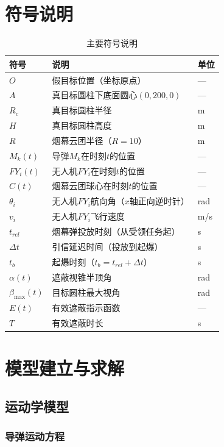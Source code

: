 \documentclass[12pt,a4paper]{article}
\begin{document}
\section{符号说明}

\begin{table}[H]
\centering
\caption{主要符号说明}
\begin{tabular}{lll}
\toprule
符号 & 说明 & 单位 \\
\midrule
$O$ & 假目标位置（坐标原点） & --- \\
$A$ & 真目标圆柱下底面圆心$(0,200,0)$ & --- \\
$R_c$ & 真目标圆柱半径 & m \\
$H$ & 真目标圆柱高度 & m \\
$R$ & 烟幕云团半径（$R=10$） & m \\
$M_k(t)$ & 导弹$M_k$在时刻$t$的位置 & --- \\
$FY_i(t)$ & 无人机$FY_i$在时刻$t$的位置 & --- \\
$C(t)$ & 烟幕云团球心在时刻$t$的位置 & --- \\
$\theta_i$ & 无人机$FY_i$航向角（$x$轴正向逆时针） & rad \\
$v_i$ & 无人机$FY_i$飞行速度 & m/s \\
$t_{rel}$ & 烟幕弹投放时刻（从受领任务起） & s \\
$\Delta t$ & 引信延迟时间（投放到起爆） & s \\
$t_b$ & 起爆时刻（$t_b = t_{rel} + \Delta t$） & s \\
$\alpha(t)$ & 遮蔽视锥半顶角 & rad \\
$\beta_{\max}(t)$ & 目标圆柱最大视角 & rad \\
$E(t)$ & 有效遮蔽指示函数 & --- \\
$T$ & 有效遮蔽时长 & s \\
\bottomrule
\end{tabular}
\end{table}

\section{模型建立与求解}

\subsection{运动学模型}

\subsubsection{导弹运动方程}
\end{document}
